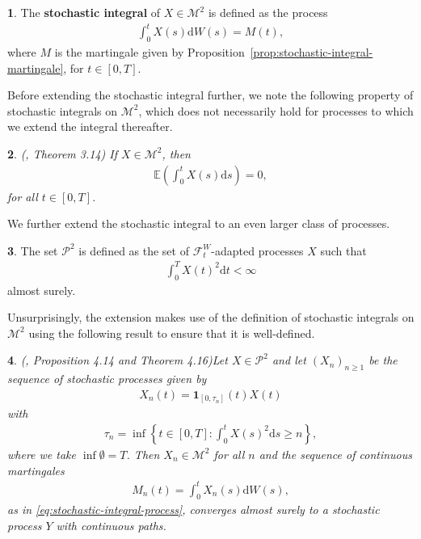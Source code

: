 \documentclass[english]{article}
\numberwithin{equation}{section}
\numberwithin{figure}{section}
\theoremstyle{bolddescit}
\newtheorem{theorem}{\protect\theoremname}[section]
\theoremstyle{definition}
\newtheorem{definition}[theorem]{\protect\definitionname}
\theoremstyle{definition}
\theoremstyle{plain}
\theoremstyle{plain}
\theoremstyle{bolddesc}
\theoremstyle{plain}
\newtheorem{proposition}[theorem]{\protect\propositionname}
\theoremstyle{remark}
\providecommand{\definitionname}{Definition}
\providecommand{\propositionname}{Proposition}
\providecommand{\theoremname}{Theorem}
\begin{document}
\begin{definition}\label{def:stochastic-integral-as-process}
  The \textbf{stochastic integral} of $X \in \mathcal{M}^2$ is defined as the process
  \begin{align}\label{eq:stochastic-integral-process}
    \int_0^t X(s) \mathrm{d}W(s) = M(t),
  \end{align}
  where $M$ is the martingale given by Proposition~\ref{prop:stochastic-integral-martingale}, for $t \in [0,T]$.
\end{definition}

Before extending the stochastic integral further, we note the following property of stochastic integrals on $\mathcal{M}^2$, which does not necessarily hold for processes to which we extend the integral thereafter.

\begin{theorem}\label{thm:stochastic-integral-expectation-m2}
  (\cite{capinski_stochastic_2012}, Theorem 3.14)
  If $X \in \mathcal{M}^2$, then
  \begin{align*}
    \mathbb{E}\left(\int_0^t X(s) \mathrm{d}s\right) = 0,
  \end{align*}
  for all $t \in [0,T]$.
\end{theorem}

We further extend the stochastic integral to an even larger class of processes.

\begin{definition}
  The set $\mathcal{P}^2$ is defined as the set of $\mathcal{F}^W_t$-adapted processes $X$ such that
  \begin{align*}
    \int_0^T X(t)^2 \mathrm{d}t < \infty
  \end{align*}
  almost surely.
\end{definition}

Unsurprisingly, the extension makes use of the definition of stochastic integrals on $\mathcal{M}^2$ using the following result to ensure that it is well-defined.

\begin{proposition}(\cite{capinski_stochastic_2012}, Proposition 4.14 and Theorem 4.16)\label{prop:p2-localising-sequence}
  Let $X \in \mathcal{P}^2$ and let $(X_n)_{n \ge 1}$ be the sequence of stochastic processes given by
  \begin{align*}
    X_n(t) = \mathbf{1}_{[0,\tau_n]}(t) X(t)
  \end{align*}
  with
  \begin{align*}
    \tau_n = \inf \left\{ t \in [0,T] : \int_0^t X(s)^2 \mathrm{d}s \ge n \right\},
  \end{align*}
  where we take $\inf \emptyset = T$.
  Then $X_n \in \mathcal{M}^2$ for all $n$ and the sequence of continuous martingales
  \begin{align*}
    M_n(t) = \int_0^t X_n(s) \mathrm{d}W(s),
  \end{align*}
  as in \eqref{eq:stochastic-integral-process}, converges almost surely to a stochastic process $Y$ with continuous paths.
\end{proposition}
\end{document}
